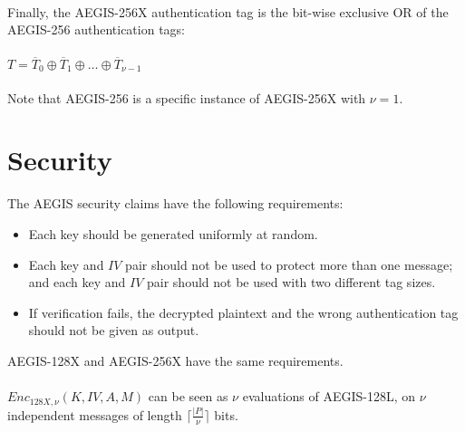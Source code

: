 \documentclass[envcountsame,runningheads,notitlepage]{llncs}
\begin{document}
\paragraph{}

Finally, the AEGIS-256X authentication tag is the bit-wise exclusive OR of the AEGIS-256 authentication tags:

\paragraph{}

\begin{math}
  T = \overline{T}_0 \oplus \overline{T}_1 \oplus \ldots \oplus \overline{T}_{\nu-1}
\end{math}

\paragraph{}

Note that AEGIS-256 is a specific instance of AEGIS-256X with $\nu=1$.

\section{Security}
\label{sec:security}

The AEGIS security claims have the following requirements:

\begin{itemize}
  \item Each key should be generated uniformly at random.
  \item Each key and $IV$ pair should not be used to protect more than one message; and each key and $IV$ pair should not be used with two different tag sizes.
  \item If verification fails, the decrypted plaintext and the wrong authentication tag should not be given as output.
\end{itemize}

AEGIS-128X and AEGIS-256X have the same requirements.

\paragraph{}

$Enc_{128X,\nu}(K, IV, A, M)$ can be seen as $\nu$ evaluations of AEGIS-128L, on $\nu$ independent messages of length $\lceil \frac{\lvert P \rvert}{\nu} \rceil$ bits.
\end{document}
